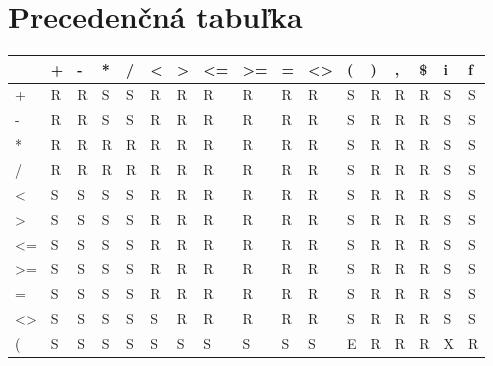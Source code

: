 \documentclass[a4paper]{article}
\begin{document}
\section{Precedenčná tabuľka}
\begin{table}[h]
\centering
\begin{tabular}{|l|l|l|l|l|l|l|l|l|l|l|l|l|l|l|l|l|}
\hline
                      & + & - & * & / & \textless & \textgreater & \textless= & \textgreater= & = & \textless\textgreater & ( & ) & , & \$ & i & f \\ \hline
+                     & R & R & S & S & R         & R            & R          & R             & R & R                     & S & R & R & R & S & S \\ \hline
-                     & R & R & S & S & R         & R            & R          & R             & R & R                     & S & R & R & R & S & S \\ \hline
*                     & R & R & R & R & R         & R            & R          & R             & R & R                     & S & R & R & R & S & S \\ \hline
/                     & R & R & R & R & R         & R            & R          & R             & R & R                     & S & R & R & R & S & S \\ \hline
\textless             & S & S & S & S & R         & R            & R          & R             & R & R                     & S & R & R & R & S & S \\ \hline
\textgreater          & S & S & S & S & R         & R            & R          & R             & R & R                     & S & R & R & R & S & S \\ \hline
\textless=            & S & S & S & S & R         & R            & R          & R             & R & R                     & S & R & R & R & S & S \\ \hline
\textgreater=         & S & S & S & S & R         & R            & R          & R             & R & R                     & S & R & R & R & S & S \\ \hline
=                     & S & S & S & S & R         & R            & R          & R             & R & R                     & S & R & R & R & S & S \\ \hline
\textless\textgreater & S & S & S & S & S         & R            & R          & R             & R & R                     & S & R & R & R & S & S \\ \hline
(                     & S & S & S & S & S         & S            & S          & S             & S & S                     & E & R & R & R & X & R \\ \hline

\end{tabular}
\end{table}
\end{document}
